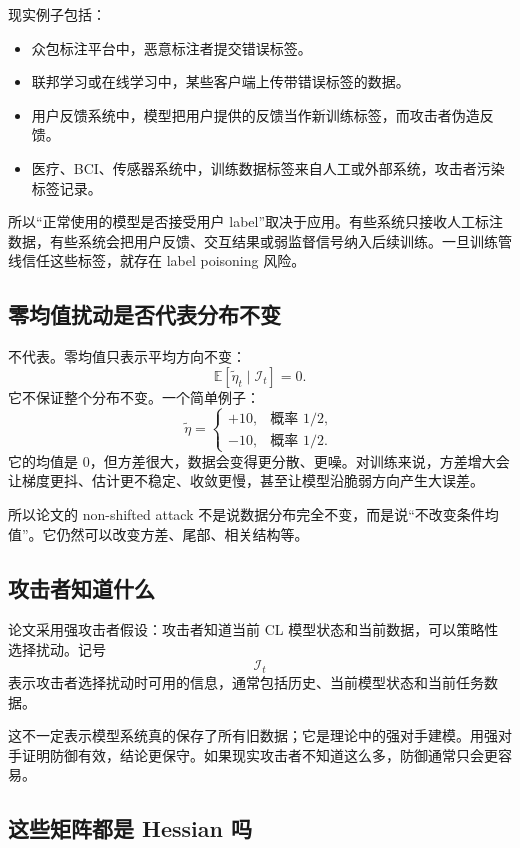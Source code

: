 \documentclass[UTF8,fontset=none,11pt]{ctexart}
\theoremstyle{cnstyle}
\newcommand{\E}{\mathbb{E}}
\newcommand{\calI}{\mathcal{I}}
\begin{document}
现实例子包括：
\begin{itemize}
  \item 众包标注平台中，恶意标注者提交错误标签。
  \item 联邦学习或在线学习中，某些客户端上传带错误标签的数据。
  \item 用户反馈系统中，模型把用户提供的反馈当作新训练标签，而攻击者伪造反馈。
  \item 医疗、BCI、传感器系统中，训练数据标签来自人工或外部系统，攻击者污染标签记录。
\end{itemize}
所以“正常使用的模型是否接受用户 label”取决于应用。有些系统只接收人工标注数据，有些系统会把用户反馈、交互结果或弱监督信号纳入后续训练。一旦训练管线信任这些标签，就存在 label poisoning 风险。

\subsection{零均值扰动是否代表分布不变}

不代表。零均值只表示平均方向不变：
\[
  \E[\tilde\eta_t\mid\calI_t]=0.
\]
它不保证整个分布不变。一个简单例子：
\[
  \tilde\eta=
  \begin{cases}
  +10,&\text{概率 }1/2,\\
  -10,&\text{概率 }1/2.
  \end{cases}
\]
它的均值是 0，但方差很大，数据会变得更分散、更噪。对训练来说，方差增大会让梯度更抖、估计更不稳定、收敛更慢，甚至让模型沿脆弱方向产生大误差。

所以论文的 non-shifted attack 不是说数据分布完全不变，而是说“不改变条件均值”。它仍然可以改变方差、尾部、相关结构等。

\subsection{攻击者知道什么}

论文采用强攻击者假设：攻击者知道当前 CL 模型状态和当前数据，可以策略性选择扰动。记号
\[
  \calI_t
\]
表示攻击者选择扰动时可用的信息，通常包括历史、当前模型状态和当前任务数据。

这不一定表示模型系统真的保存了所有旧数据；它是理论中的强对手建模。用强对手证明防御有效，结论更保守。如果现实攻击者不知道这么多，防御通常只会更容易。

\subsection{这些矩阵都是 Hessian 吗}
\end{document}
